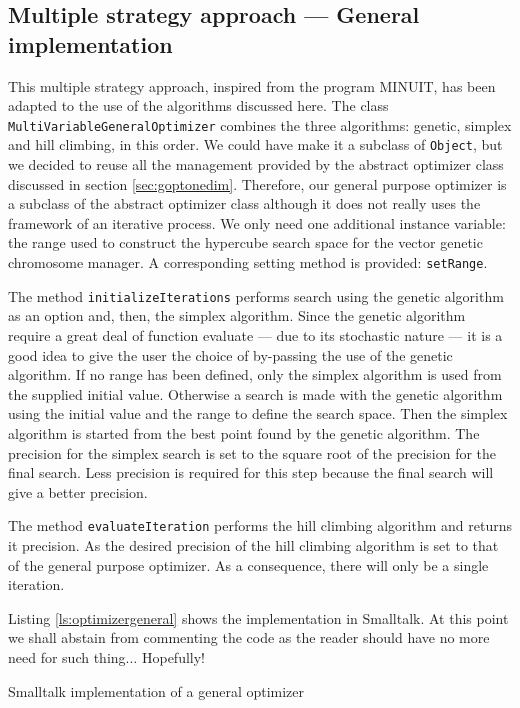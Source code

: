 \documentclass[twoside]{book}
\begin{document}
\subsection{Multiple strategy approach --- General implementation}
This multiple strategy approach, inspired from the program MINUIT,
has been adapted to the use of the algorithms discussed here. The
class {\tt MultiVariableGeneralOptimizer} combines the three
algorithms: genetic, simplex and hill climbing, in this order. We
could have make it a subclass of {\tt Object}, but we decided to
reuse all the management provided by the abstract optimizer class
discussed in section \ref{sec:goptonedim}. Therefore, our general
purpose optimizer is a subclass of the abstract optimizer class
although it does not really uses the framework of an iterative
process. We only need one additional instance variable: the range
used to construct the hypercube search space for the vector
genetic chromosome manager. A corresponding setting method is
provided: {\tt setRange}.

The method {\tt initializeIterations} performs search using the
genetic algorithm as an option and, then, the simplex algorithm.
Since the genetic algorithm require a great deal of function
evaluate --- due to its stochastic nature --- it is a good idea to
give the user the choice of by-passing the use of the genetic
algorithm. If no range has been defined, only the simplex
algorithm is used from the supplied initial value. Otherwise a
search is made with the genetic algorithm using the initial value
and the range to define the search space. Then the simplex
algorithm is started from the best point found by the genetic
algorithm. The precision for the simplex search is set to the
square root of the precision for the final search. Less precision
is required for this step because the final search will give a
better precision.

The method {\tt evaluateIteration} performs the hill climbing
algorithm and returns it precision. As the desired precision of
the hill climbing algorithm is set to that of the general purpose
optimizer. As a consequence, there will only be a single
iteration.

Listing \ref{ls:optimizergeneral} shows the implementation in
Smalltalk. At this point we shall abstain from
commenting the code as the reader should have no more need for
such thing$\ldots$ Hopefully!

\begin{listing} Smalltalk
implementation of a general optimizer \label{ls:optimizergeneral}

\end{listing}

\ifx\wholebook\relax\else
\end{document}
